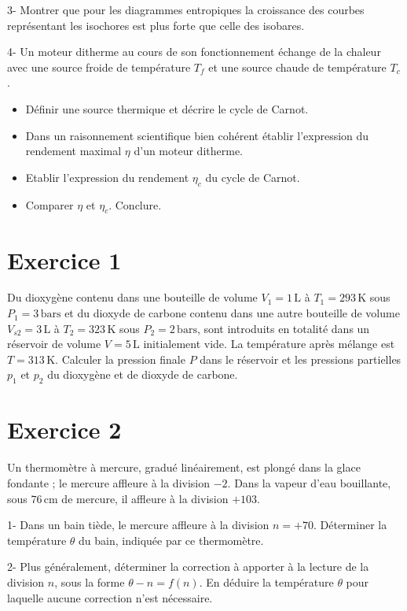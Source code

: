 \documentclass[a4paper,12pt]{article}
\begin{document}
	3- Montrer que pour les diagrammes entropiques la croissance des courbes représentant les isochores est plus forte que celle des isobares.
	
	4- Un moteur ditherme au cours de son fonctionnement échange de la chaleur avec une source froide de température $T_f$ et une source chaude de température $T_c$.
	\begin{itemize}
		\item[a-] Définir une source thermique et décrire le cycle de Carnot.
		\item[b-] Dans un raisonnement scientifique bien cohérent établir l'expression du rendement maximal $\eta$ d'un moteur ditherme.
		\item[c-] Etablir l'expression du rendement $\eta_c$ du cycle de Carnot.
		\item[d-] Comparer $\eta$ et $\eta_c$. Conclure.
	\end{itemize}
	
	\section*{Exercice 1}
	Du dioxygène contenu dans une bouteille de volume $V_1 = 1\,\text{L}$ à $T_1 = 293\,\text{K}$ sous $P_1 = 3\,\text{bars}$ et du dioxyde de carbone contenu dans une autre bouteille de volume $V_{s2} = 3\,\text{L}$ à $T_2 = 323\,\text{K}$ sous $P_2 = 2\,\text{bars}$, sont introduits en totalité dans un réservoir de volume $V = 5\,\text{L}$ initialement vide. La température après mélange est $T = 313\,\text{K}$. Calculer la pression finale $P$ dans le réservoir et les pressions partielles $p_1$ et $p_2$ du dioxygène et de dioxyde de carbone.
	
	\section*{Exercice 2}
	Un thermomètre à mercure, gradué linéairement, est plongé dans la glace fondante ; le mercure affleure à la division $-2$. Dans la vapeur d'eau bouillante, sous $76\,\text{cm}$ de mercure, il affleure à la division $+103$.
	
	1- Dans un bain tiède, le mercure affleure à la division $n = +70$. Déterminer la température $\theta$ du bain, indiquée par ce thermomètre.
	
	2- Plus généralement, déterminer la correction à apporter à la lecture de la division $n$, sous la forme $\theta - n = f(n)$. En déduire la température $\theta$ pour laquelle aucune correction n'est nécessaire.
	
\end{document}
